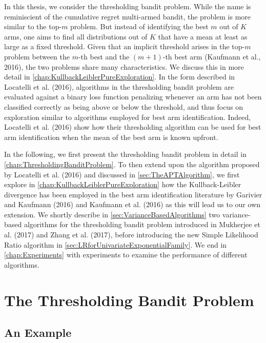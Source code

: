 \documentclass[11pt,]{article}
\begin{document}
In this thesis, we consider the thresholding bandit problem. While the
name is reminiscient of the cumulative regret multi-armed bandit, the
problem is more similar to the top-\(m\) problem. But instead of
identifying the best \(m\) out of \(K\) arms, one aims to find all
distributions out of \(K\) that have a mean at least as large as a fixed
threshold. Given that an implicit threshold arises in the top-\(m\)
problem between the \(m\)-th best and the \((m+1)\)-th best arm
(Kaufmann et al., 2016), the two problems share many characteristics. We
discuss this in more detail in
\autoref{chap:KullbackLeiblerPureExploration}. In the form described in
Locatelli et al. (2016), algorithms in the thresholding bandit problem
are evaluated against a binary loss function penalizing whenever an arm
has not been classified correctly as being above or below the threshold,
and thus focus on exploration similar to algorithms employed for best
arm identification. Indeed, Locatelli et al. (2016) show how their
thresholding algorithm can be used for best arm identification when the
mean of the best arm is known upfront.

In the following, we first present the thresholding bandit problem in
detail in \autoref{chap:ThresholdingBanditProblem}. To then extend upon
the algorithm proposed by Locatelli et al. (2016) and discussed in
\autoref{sec:TheAPTAlgorithm}, we first explore in
\autoref{chap:KullbackLeiblerPureExploration} how the Kullback-Leibler
divergence has been employed in the best arm identification literature
by Garivier and Kaufmann (2016) and Kaufmann et al. (2016) as this will
lead us to our own extension. We shortly describe in
\autoref{sec:VarianceBasedAlgorithms} two variance-based algorithms for
the thresholding bandit problem introduced in Mukherjee et al. (2017)
and Zhang et al. (2017), before introducing the new Simple Likelihood
Ratio algorithm in \autoref{sec:LRforUnivariateExponentialFamily}. We
end in \autoref{chap:Experiments} with experiments to examine the
performance of different algorithms.

\newpage

\section{\texorpdfstring{The Thresholding Bandit Problem
\label{chap:ThresholdingBanditProblem}}{The Thresholding Bandit Problem }}\label{the-thresholding-bandit-problem}

\subsection{An Example}\label{an-example}
\end{document}
